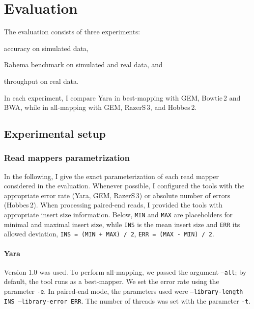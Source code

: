 

\section{Evaluation}
\label{sec:yara:eval}

The evaluation consists of three experiments: \begin{inparaenum}[(i)]
\item accuracy on simulated data,
\item Rabema benchmark on simulated and real data, and
\item throughput on real data.
\end{inparaenum}
In each experiment, I compare Yara in best-mapping with GEM, Bowtie\,2 and BWA, while in all-mapping with GEM, RazerS\,3, and Hobbes\,2.

\subsection{Experimental setup}

\subsubsection{Read mappers parametrization}

In the following, I give the exact parameterization of each read mapper considered in the evaluation.
Whenever possible, I configured the tools with the appropriate error rate (Yara, GEM, RazerS\,3) or absolute number of errors (Hobbes\,2).
When processing paired-end reads, I provided the tools with appropriate insert size information.
Below, \texttt{MIN} and \texttt{MAX} are placeholders for minimal and maximal insert size, while \texttt{INS} is the mean insert size and \texttt{ERR} its allowed deviation, \ie \texttt{INS = (MIN + MAX) / 2}, \texttt{ERR = (MAX - MIN) / 2}.

\paragraph{Yara}
Version 1.0 was used.
To perform all-mapping, we passed the argument \texttt{--all}; by default, the tool runs as a best-mapper.
We set the error rate using the parameter \texttt{-e}.
In paired-end mode, the parameters used were \texttt{--library-length INS --library-error ERR}.
The number of threads was set with the parameter \texttt{-t}.

